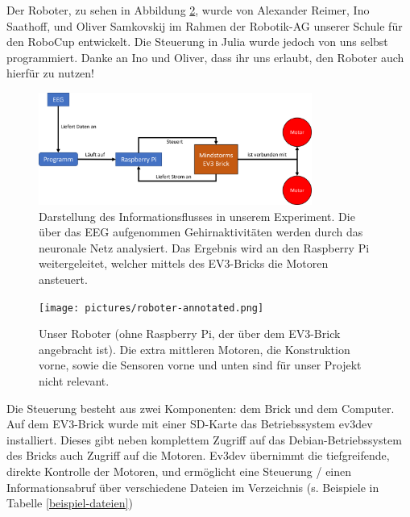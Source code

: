 \documentclass[11pt]{scrartcl}
\begin{document}
	Der Roboter, zu sehen in Abbildung \ref{Robot}, wurde von Alexander Reimer, Ino Saathoff, und Oliver Samkovskij im Rahmen der Robotik-AG unserer Schule für den RoboCup entwickelt. Die Steuerung in Julia wurde jedoch von uns selbst programmiert. Danke an Ino und Oliver, dass ihr uns erlaubt, den Roboter auch hierfür zu nutzen!

	\begin{figure}[H]
		\centering
		\includegraphics[width=0.8\textwidth]{pictures/roboter-funktionsweise.png}
		\caption{Darstellung des Informationsflusses in unserem Experiment. Die über das EEG aufgenommen Gehirnaktivitäten werden durch das neuronale Netz analysiert. Das Ergebnis wird an den Raspberry Pi weitergeleitet, welcher mittels des EV3-Bricks die Motoren ansteuert.}
		\label{robot-funktion}
	\end{figure}

	\begin{figure}[H]
		\centering
		\texttt{[image: pictures/roboter-annotated.png]}
		\caption{Unser Roboter (ohne Raspberry Pi, der über dem EV3-Brick angebracht ist). Die extra mittleren Motoren, die Konstruktion vorne, sowie die Sensoren vorne und unten sind für unser Projekt nicht relevant.}
		\label{Robot}
	\end{figure}

	Die Steuerung besteht aus zwei Komponenten: dem Brick und dem Computer.
	Auf dem EV3-Brick wurde mit einer SD-Karte das Betriebssystem ev3dev installiert. Dieses gibt neben komplettem Zugriff auf das Debian-Betriebssystem des Bricks auch Zugriff auf die Motoren. Ev3dev übernimmt die tiefgreifende, direkte Kontrolle der Motoren, und ermöglicht eine Steuerung / einen Informationsabruf über verschiedene Dateien im  Verzeichnis (s. Beispiele in Tabelle \ref{beispiel-dateien})
\end{document}
